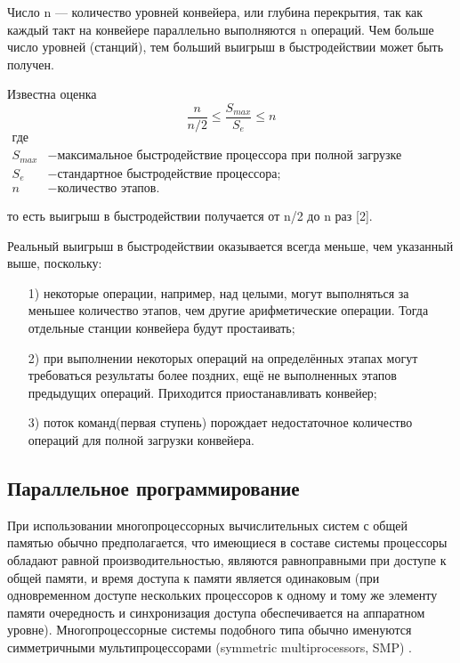 \documentclass[12pt,a4paper]{article}
\numberwithin{equation}{section}
\begin{document}
Число n — количество уровней конвейера, или глубина перекрытия, так как каждый такт на конвейере параллельно выполняются n операций. Чем больше число уровней (станций), тем больший выигрыш в быстродействии может быть получен.

Известна оценка
\begin{equation}\label{form:way}
{\frac{n}{n/2} \leq {\frac{S_{max}}{S_{e}}} \leq n}
 \end{equation}
 \begin{align*}
    \text{где} \\
    S_{max} &- \text{максимальное быстродействие процессора  при полной загрузке конвейера;} \\
    S_{e} &- \text{стандартное быстродействие процессора;} \\
   n &- \text{количество этапов.}
\end{align*}

то есть выигрыш в быстродействии получается от n/2  до n раз [2].


Реальный выигрыш в быстродействии оказывается всегда меньше, чем указанный выше, поскольку:

\begin{enumerate}
\item[1)] некоторые операции, например, над целыми, могут выполняться за меньшее количество этапов, чем другие арифметические операции. Тогда отдельные станции конвейера будут простаивать;
\item[2)] при выполнении некоторых операций на определённых этапах могут требоваться результаты более поздних, ещё не выполненных этапов предыдущих операций. Приходится приостанавливать конвейер;
\item[3)] поток команд(первая ступень) порождает недостаточное количество операций для полной загрузки конвейера.
\end{enumerate}

\subsection{Параллельное программирование}
При использовании многопроцессорных вычислительных систем с общей памятью обычно предполагается, что имеющиеся в составе системы процессоры обладают равной производительностью, являются равноправными при доступе к общей памяти, и время доступа к памяти является одинаковым (при одновременном доступе нескольких процессоров к одному и тому же элементу памяти очередность и синхронизация доступа обеспечивается на аппаратном уровне). Многопроцессорные системы подобного типа обычно именуются симметричными мультипроцессорами (symmetric multiprocessors, SMP) \cite{litlink3}.\\
\end{document}
